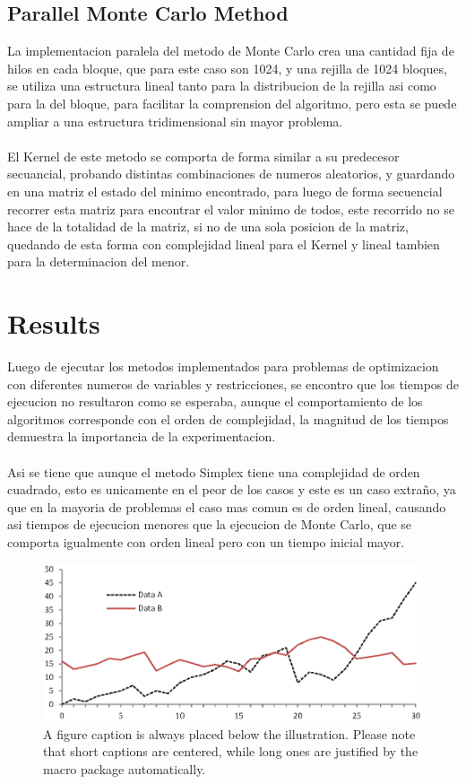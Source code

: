 \documentclass[runningheads]{llncs}
\begin{document}
\subsection{Parallel Monte Carlo Method}
La implementacion paralela del metodo de Monte Carlo crea una cantidad fija de hilos en cada bloque, que para este caso son 1024, y una rejilla de 1024 bloques, se utiliza una estructura lineal tanto para la distribucion de la rejilla asi como para la del bloque, para facilitar la comprension del algoritmo, pero esta se puede ampliar a una estructura tridimensional sin mayor problema.
\paragraph{}
El Kernel de este metodo se comporta de forma similar a su predecesor secuancial, probando distintas combinaciones de numeros aleatorios, y guardando en una matriz el estado del minimo encontrado, para luego de forma secuencial recorrer esta matriz para encontrar el valor minimo de todos, este recorrido no se hace de la totalidad de la matriz, si no de una sola posicion de la matriz, quedando de esta forma con complejidad lineal para el Kernel y lineal tambien para la determinacion del menor.

\section{Results}
Luego de ejecutar los metodos implementados para problemas de optimizacion con diferentes numeros de variables y restricciones, se encontro que los tiempos de ejecucion no resultaron como se esperaba, aunque el comportamiento de los algoritmos corresponde con el orden de complejidad, la magnitud de los tiempos demuestra la importancia de la experimentacion.
\paragraph{}
Asi se tiene que aunque el metodo Simplex tiene una complejidad de orden cuadrado, esto es unicamente en el peor de los casos y este es un caso extraño, ya que en la mayoria de problemas el caso mas comun es de orden lineal, causando asi tiempos de ejecucion menores que la ejecucion de Monte Carlo, que se comporta igualmente con orden lineal pero con un tiempo inicial mayor.

\begin{figure}
\includegraphics[width=\textwidth]{fig1.eps}
\caption{A figure caption is always placed below the illustration.
Please note that short captions are centered, while long ones are
justified by the macro package automatically.} \label{fig1}
\end{figure}
\end{document}
